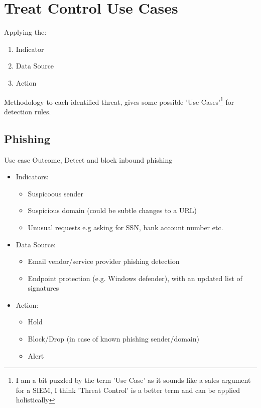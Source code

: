 \documentclass[
	letterpaper, %
	10pt, %
	unnumberedsections, %
	twoside, %
]{APAAssignment}
\begin{document}
\section{Treat Control Use Cases}

Applying the:
\begin{spacing}{1}
	\begin{enumerate}
		\item Indicator
		\item Data Source
		\item Action
	\end{enumerate}
\end{spacing}
Methodology to each identified threat, gives some possible 'Use Cases'\footnote{I am a bit puzzled by the term 'Use Case' as it sounds like a sales argument for a SIEM, I think 'Threat Control' is a better term and can be applied holistically} for detection rules.

\subsection{Phishing}
Use case Outcome, Detect and block inbound phishing
\begin{spacing}{1}
	\begin{itemize}
		\item Indicators:
		      \begin{itemize}
			      \item Suspicoous sender
			      \item Suspicious domain (could be subtle changes to a URL)
			      \item Unusual requests e.g asking for SSN, bank account number etc.
		      \end{itemize}
		\item Data Source:
		      \begin{itemize}
			      \item Email vendor/service provider phishing detection
			      \item Endpoint protection (e.g. Windows defender\cite{WindowsDefenderCommercial}), with an updated list of signatures
		      \end{itemize}
		\item Action:
		      \begin{itemize}
			      \item Hold
			      \item Block/Drop (in case of known phishing sender/domain)
			      \item Alert
		      \end{itemize}
	\end{itemize}
\end{spacing}
\end{document}
